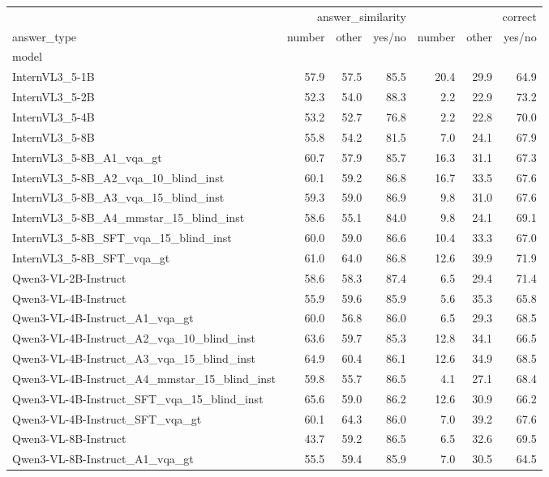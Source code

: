 \begin{tabular}{lrrrrrr}
\toprule
 & \multicolumn{3}{r}{answer_similarity} & \multicolumn{3}{r}{correct} \\
answer_type & number & other & yes/no & number & other & yes/no \\
model &  &  &  &  &  &  \\
\midrule
InternVL3_5-1B & 57.9 & 57.5 & 85.5 & 20.4 & 29.9 & 64.9 \\
InternVL3_5-2B & 52.3 & 54.0 & 88.3 & 2.2 & 22.9 & 73.2 \\
InternVL3_5-4B & 53.2 & 52.7 & 76.8 & 2.2 & 22.8 & 70.0 \\
InternVL3_5-8B & 55.8 & 54.2 & 81.5 & 7.0 & 24.1 & 67.9 \\
InternVL3_5-8B_A1_vqa_gt & 60.7 & 57.9 & 85.7 & 16.3 & 31.1 & 67.3 \\
InternVL3_5-8B_A2_vqa_10_blind_inst & 60.1 & 59.2 & 86.8 & 16.7 & 33.5 & 67.6 \\
InternVL3_5-8B_A3_vqa_15_blind_inst & 59.3 & 59.0 & 86.9 & 9.8 & 31.0 & 67.6 \\
InternVL3_5-8B_A4_mmstar_15_blind_inst & 58.6 & 55.1 & 84.0 & 9.8 & 24.1 & 69.1 \\
InternVL3_5-8B_SFT_vqa_15_blind_inst & 60.0 & 59.0 & 86.6 & 10.4 & 33.3 & 67.0 \\
InternVL3_5-8B_SFT_vqa_gt & 61.0 & 64.0 & 86.8 & 12.6 & 39.9 & 71.9 \\
Qwen3-VL-2B-Instruct & 58.6 & 58.3 & 87.4 & 6.5 & 29.4 & 71.4 \\
Qwen3-VL-4B-Instruct & 55.9 & 59.6 & 85.9 & 5.6 & 35.3 & 65.8 \\
Qwen3-VL-4B-Instruct_A1_vqa_gt & 60.0 & 56.8 & 86.0 & 6.5 & 29.3 & 68.5 \\
Qwen3-VL-4B-Instruct_A2_vqa_10_blind_inst & 63.6 & 59.7 & 85.3 & 12.8 & 34.1 & 66.5 \\
Qwen3-VL-4B-Instruct_A3_vqa_15_blind_inst & 64.9 & 60.4 & 86.1 & 12.6 & 34.9 & 68.5 \\
Qwen3-VL-4B-Instruct_A4_mmstar_15_blind_inst & 59.8 & 55.7 & 86.5 & 4.1 & 27.1 & 68.4 \\
Qwen3-VL-4B-Instruct_SFT_vqa_15_blind_inst & 65.6 & 59.0 & 86.2 & 12.6 & 30.9 & 66.2 \\
Qwen3-VL-4B-Instruct_SFT_vqa_gt & 60.1 & 64.3 & 86.0 & 7.0 & 39.2 & 67.6 \\
Qwen3-VL-8B-Instruct & 43.7 & 59.2 & 86.5 & 6.5 & 32.6 & 69.5 \\
Qwen3-VL-8B-Instruct_A1_vqa_gt & 55.5 & 59.4 & 85.9 & 7.0 & 30.5 & 64.5 \\

\end{tabular}

